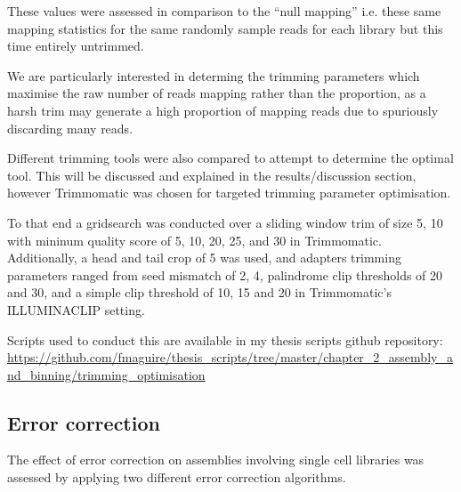 These values were assessed in comparison to the ``null mapping'' i.e. these same mapping statistics for the same
randomly sample reads for each library but this time entirely untrimmed.  

%
%
%
%
%
%

We are particularly interested in determing the trimming parameters which maximise the raw number of reads mapping rather than
the proportion, as a harsh trim may generate a high proportion of mapping reads due to spuriously discarding 
many reads.  

Different trimming tools were also compared to attempt to determine the optimal tool.
This will be discussed and explained in the results/discussion section, however Trimmomatic \citep{Bolger2014a}
was chosen for targeted trimming parameter optimisation.

To that end a gridsearch was conducted over a sliding window trim of size 5, 10 
with mininum quality score of 5, 10, 20, 25, and 30 in Trimmomatic.  Additionally, 
a head and tail crop of 5 was used, and adapters trimming parameters
ranged from seed mismatch of 2, 4, palindrome clip thresholds of 20 and 30, 
and a simple clip threshold of 10, 15 and 20 in Trimmomatic's ILLUMINACLIP setting.

Scripts used to conduct this are available in my thesis scripts github repository:
\url{https://github.com/fmaguire/thesis_scripts/tree/master/chapter_2_assembly_and_binning/trimming_optimisation}

\subsection{Error correction}

The effect of error correction on assemblies involving single cell libraries was assessed 
by applying two different error correction algorithms. 

